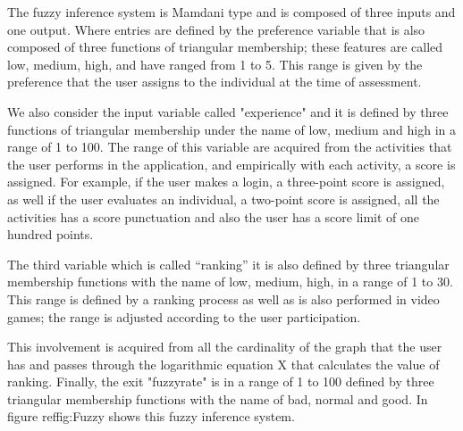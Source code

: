 The fuzzy inference system is Mamdani type and is composed of three inputs and one output. Where entries are defined by the preference variable that is also composed of three functions of triangular membership; these features are called low, medium, high, and have ranged from 1 to 5. This range is given by the preference that the user assigns to the individual at the time of assessment.

We also consider the input variable called "experience" and it is defined by three functions of triangular membership under the name of low, medium and high in a range of 1 to 100. The range of this variable are acquired from the activities that the user performs in the application, and empirically with each activity, a score is assigned. For example, if the user makes a login, a three-point score is assigned, as well if the user evaluates an individual, a two-point score is assigned, all the activities has a score punctuation and also the user has a score limit of one hundred points.

The third variable which is called “ranking” it is also defined by three triangular membership functions with the name of low, medium, high, in a range of 1 to 30. This range is defined by a ranking process as well as is also performed in video games; the range is adjusted according to the user participation.

This involvement is acquired from all the cardinality of the graph that the user has and passes through the logarithmic equation X that calculates the value of ranking. Finally, the exit "fuzzyrate" is in a range of 1 to 100 defined by three triangular membership functions with the name of bad, normal and good. In figure ref{fig:Fuzzy} shows this fuzzy inference system.


